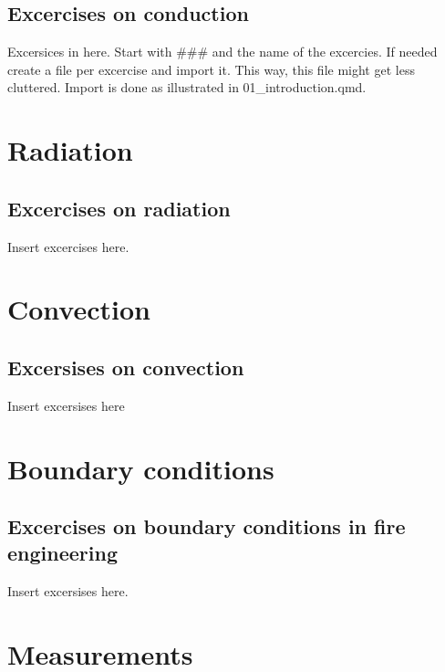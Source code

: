 \documentclass[
  letterpaper,
  DIV=11,
  numbers=noendperiod]{scrreprt}
\begin{document}
\section{Excercises on conduction}\label{sec-conductionx}

Excersices in here. Start with \#\#\# and the name of the excercies. If
needed create a file per excercise and import it. This way, this file
might get less cluttered. Import is done as illustrated in
01\_introduction.qmd.


\chapter{Radiation}\label{sec-radiation}

\section{Excercises on radiation}\label{sec-radiationx}

Insert excercises here.


\chapter{Convection}\label{sec-convection}

\section{Excersises on convection}\label{sec-convectionx}

Insert excersises here


\chapter{Boundary conditions}\label{sec-boundary}

\section{Excercises on boundary conditions in fire
engineering}\label{sec-boundaryx}

Insert excersises here.


\chapter{Measurements}\label{sec-measurement}
\end{document}
